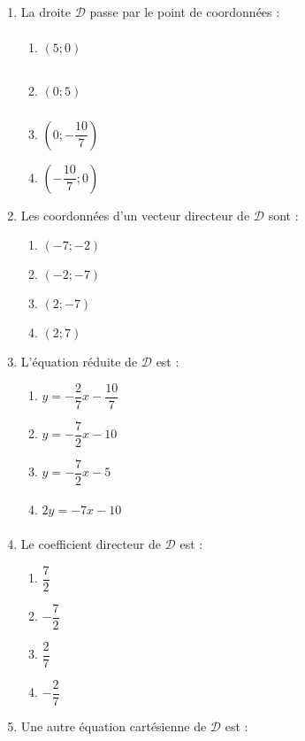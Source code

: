 \documentclass[a4paper]{article}
\begin{document}
\begin{enumerate}
  \item La droite $\mathcal{D}$ passe par le point de coordonnées :
  \begin{multicols}{4}
    \begin{enumerate}
      \item $(5;0)\phantom{\left(\dfrac{10}{7}\right.}$
      \item $(0;5)\phantom{\left(\dfrac{10}{7}\right.}$
      \item $\left(0;-\dfrac{10}{7}\right)$
      \item $\left(-\dfrac{10}{7};0\right)$
    \end{enumerate}
  \end{multicols}
  \item Les coordonnées d'un vecteur directeur de $\mathcal{D}$ sont :
    \begin{multicols}{4}
      \begin{enumerate}
	\item $(-7;-2)$
	\item $(-2;-7)$
	\item $(2;-7)$
	\item $(2;7)$
      \end{enumerate}
    \end{multicols}
  \item L'équation réduite de $\mathcal{D}$ est :
    \begin{multicols}{4}
      \begin{enumerate}
	\item $y=-\dfrac{2}{7}x-\dfrac{10}{7}$
	\item $y=-\dfrac{7}{2}x-10$
	\item $y=-\dfrac{7}{2}x-5$
	\item $2y=-7x-10\phantom{\dfrac{7}{2}}$
      \end{enumerate}
    \end{multicols}
  \item Le coefficient directeur de $\mathcal{D}$ est :
    \begin{multicols}{4}
      \begin{enumerate}
	\item $\dfrac{7}{2}$
	\item $-\dfrac{7}{2}$
	\item $\dfrac{2}{7}$
	\item $-\dfrac{2}{7}$
      \end{enumerate}
    \end{multicols}
  \item Une autre équation cartésienne de $\mathcal{D}$ est :

\end{enumerate}
\end{document}
